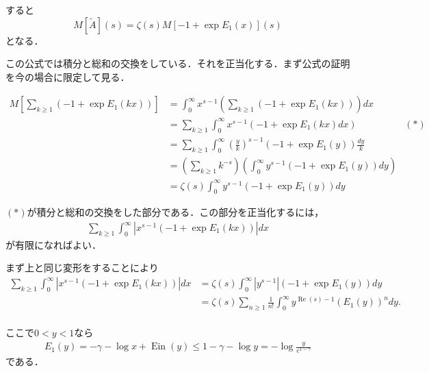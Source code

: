 \documentclass{jsarticle}
\newcommand{\Ein}{\operatorname{Ein}}
\renewcommand\Re{\operatorname{Re}}
\theoremstyle{definition}
\begin{document}
すると
\[ M[\tilde{A}](s) = \zeta(s) M\left[ -1 + \exp E_1(x) \right](s) \]
となる．

この公式では積分と総和の交換をしている．それを正当化する．まず公式の証明を今の場合に限定して見る．

\begin{align*}
M\left[\sum_{k \ge 1} \left(-1 + \exp E_1(k x) \right)\right]
&= \int_0^\infty x^{s-1} \left(\sum_{k \ge 1} \left(-1 + \exp E_1(k x) \right)\right) dx \\
&= \sum_{k \ge 1} \int_0^\infty x^{s-1} \left(-1 + \exp E_1(k x) dx \right)  & (\ast) \\
&=  \sum_{k \ge 1} \int_0^\infty \left(\frac{y}{k}\right)^{s-1} \left(-1 + \exp E_1(y) \right) \frac{dy}{k} \\
&=  \left(\sum_{k \ge 1} k^{-s}\right) \left(\int_0^\infty y^{s-1} \left(-1 + \exp E_1(y) \right) dy\right) \\
&= \zeta(s) \int_0^\infty y^{s-1} \left(-1 + \exp E_1(y) \right) dy
\end{align*}

$(\ast)$が積分と総和の交換をした部分である．この部分を正当化するには，
\begin{align*}
\sum_{k \ge 1} \int_0^\infty \left|x^{s-1} \left(-1 + \exp E_1(k x) \right)\right| dx
\end{align*}
が有限になればよい．

まず上と同じ変形をすることにより
\begin{align*}
\sum_{k \ge 1} \int_0^\infty \left|x^{s-1} \left(-1 + \exp E_1(k x) \right)\right| dx
&= \zeta(s) \int_0^\infty |y^{s-1}| \left(-1 + \exp E_1(y) \right) dy \\
&= \zeta(s) \sum_{n \ge 1} \frac{1}{n!} \int_0^\infty y^{\Re(s)-1} \left(E_1(y)\right)^n dy. \\
\end{align*}

ここで$0 < y < 1$なら
\begin{align*}
E_1(y) = -\gamma-\log x+\Ein(y) \le 1-\gamma-\log y = -\log \frac{y}{e^{1-\gamma}}
\end{align*}
である．
\end{document}
